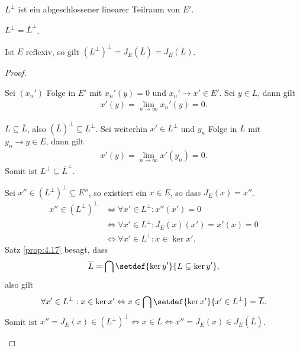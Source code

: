 \begin{prop}
\label{prop:6.16}
\begin{propenum}
  \item $L^\bot$ ist ein abgeschlossener linearer Teilraum von $E'$.
  \item $L^\bot = \overline{L}^\bot$.
  \item Ist $E$ reflexiv, so gilt $(L^\bot)^\bot = J_E(\overline{L}) =
  \overline{J_E(L)}$.\fishhere
\end{propenum}
\end{prop}
\begin{proof}
\begin{proofenum}
  \item Sei $(x_n')$ Folge in $E'$ mit $x_n'(y)=0$ und $x_n'\to x'\in E'$. Sei
  $y\in L$, dann gilt
\begin{align*}
x'(y) = \lim\limits_{n\to\infty} x_n'(y) = 0.
\end{align*}
\item $L\subseteq \overline{L}$, also $(\overline{L})^\bot \subseteq L^\bot$.
Sei weiterhin $x'\in L^\bot$ und $y_n$ Folge in $L$ mit $y_n\to y\in E$, dann
gilt
\begin{align*}
x'(y) = \lim\limits_{n\to\infty} x'(y_n) = 0.
\end{align*}
Somit ist $L^\bot\subseteq \overline{L}^\bot$.
\item Sei $x''\in (L^\bot)^\bot\subseteq E''$, so existiert ein $x\in E$, so
dass $J_E(x) = x''$.
\begin{align*}
x''\in (L^\bot)^\bot 
&\Leftrightarrow \forall x' \in L^\bot : x''(x') = 0\\
&\Leftrightarrow \forall x' \in L^\bot : J_E(x)(x') = x'(x) = 0\\
&\Leftrightarrow \forall x' \in L^\bot : x\in \ker x'.
\end{align*}
Satz \ref{prop:4.17} besagt, dass
\begin{align*}
\overline{L} = \bigcap\setdef{\ker y'}{L\subseteq \ker y'},
\end{align*}
also gilt
\begin{align*}
\forall x' \in L^\bot : x\in \ker x'
\Leftrightarrow x\in \bigcap\setdef{\ker x'}{x'\in L^\bot} = \overline{L}.
\end{align*}
Somit ist $x''=J_E(x) \in (L^\bot)^\bot \Leftrightarrow x\in
\overline{L}\Leftrightarrow x'' = J_E(x) \in J_E(\overline{L})$.\qedhere
\end{proofenum}
\end{proof}


